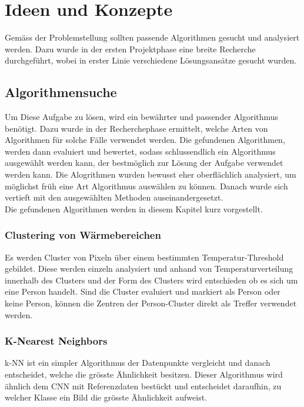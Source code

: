 \chapter{Ideen und Konzepte}
\label{ch:ideasAndConcepts}

Gemäss der Problemstellung sollten passende Algorithmen gesucht und analysiert werden. Dazu wurde in der ersten Projektphase eine breite Recherche durchgeführt, wobei in erster Linie verschiedene Lösungsansätze gesucht wurden.

\section{Algorithmensuche}

Um Diese Aufgabe zu lösen, wird ein bewährter und passender Algorithmus benötigt. Dazu wurde in der Recherchephase ermittelt, welche Arten von Algorithmen für solche Fälle verwendet werden. Die gefundenen Algorithmen, werden dann evaluiert und bewertet, sodass schlussendlich ein Algorithmus ausgewählt werden kann, der bestmöglich zur Lösung der Aufgabe verwendet werden kann. Die Alogrithmen wurden bewusst eher oberflächlich analysiert, um möglichst früh eine Art Algorithmus auswählen zu können. Danach wurde sich vertieft mit den ausgewählten Methoden auseinandergesetzt.\\
Die gefundenen Algorithmen werden in diesem Kapitel kurz vorgestellt.

\subsection{Clustering von Wärmebereichen}

Es werden Cluster von Pixeln über einem bestimmten Temperatur-Threshold gebildet. Diese werden einzeln analysiert und anhand von Temperaturverteilung innerhalb des Clusters und der Form des Clusters wird entschieden ob es sich um eine Person handelt. Sind die Cluster evaluiert und markiert als Person oder keine Person, können die Zentren der Person-Cluster direkt als Treffer verwendet werden.


\subsection{K-Nearest Neighbors}

\gls{k-NN} ist ein simpler Algorithmus der Datenpunkte vergleicht und danach entscheidet, welche die grösste Ähnlichkeit besitzen. Dieser Algorithmus wird ähnlich dem \gls{CNN} mit Referenzdaten bestückt und entscheidet daraufhin, zu welcher Klasse ein Bild die grösste Ähnlichkeit aufweist.

